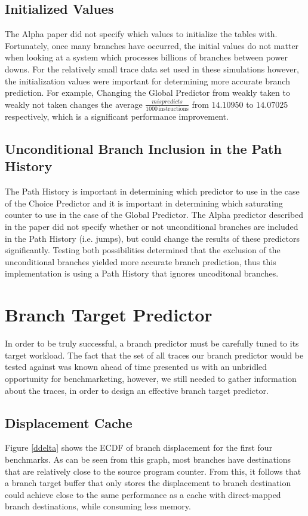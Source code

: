 \documentclass[twocolumn]{article}
\begin{document}
\subsection{Initialized Values}

The Alpha paper did not specify which values to initialize the tables with.
Fortunately, once many branches have occurred, the initial values do not matter
when looking at a system which processes billions of branches between power downs.
For the relatively small trace data set used in these simulations however,
the initialization values were important for determining more accurate branch prediction.
For example, Changing the Global Predictor from weakly taken to weakly not taken changes 
the average $\frac{mispredicts}{1000\,\text{instructions}}$ from $14.10950$ to $14.07025$
respectively, which is a significant performance improvement.
 
\subsection{Unconditional Branch Inclusion in the Path History}

The Path History is important in determining which predictor to use
in the case of the Choice Predictor and it is important in determining
which saturating counter to use in the case of the Global Predictor.
The Alpha predictor described in the paper did not specify whether or not
unconditional branches are included in the Path History (i.e. jumps), but
could change the results of these predictors significantly. Testing both 
possibilities determined that the exclusion of the unconditional branches 
yielded more accurate branch prediction, thus this implementation is using
a Path History that ignores uncoditonal branches.

\section{Branch Target Predictor} 

In order to be truly successful, a branch predictor must be carefully
tuned to its target workload. The fact that the set of all traces our
branch predictor would be tested against was known ahead of time
presented us with an unbridled opportunity for benchmarketing,
however, we still needed to gather information about the traces, in
order to design an effective branch target predictor. 

\subsection{Displacement Cache}
Figure \ref{ddelta} shows the ECDF of branch displacement for the
first four benchmarks. As can be seen from this graph, most branches
have destinations that are relatively close to the source program
counter. From this, it follows that a branch target buffer that only
stores the displacement to branch destination could achieve close to
the same performance as a cache with direct-mapped branch
destinations, while consuming less memory. 
\end{document}
